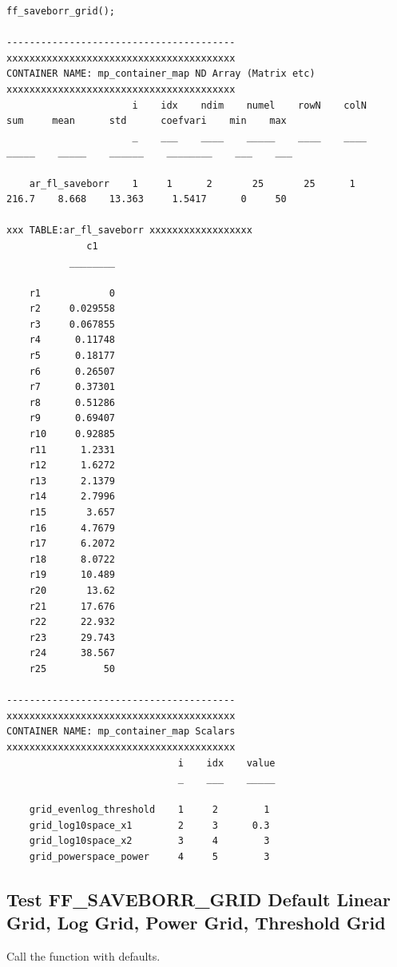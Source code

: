 \documentclass[
]{book}
\begin{document}
\begin{verbatim}
ff_saveborr_grid();

----------------------------------------
xxxxxxxxxxxxxxxxxxxxxxxxxxxxxxxxxxxxxxxx
CONTAINER NAME: mp_container_map ND Array (Matrix etc)
xxxxxxxxxxxxxxxxxxxxxxxxxxxxxxxxxxxxxxxx
                      i    idx    ndim    numel    rowN    colN     sum     mean      std      coefvari    min    max
                      _    ___    ____    _____    ____    ____    _____    _____    ______    ________    ___    ___

    ar_fl_saveborr    1     1      2       25       25      1      216.7    8.668    13.363     1.5417      0     50 

xxx TABLE:ar_fl_saveborr xxxxxxxxxxxxxxxxxx
              c1   
           ________

    r1            0
    r2     0.029558
    r3     0.067855
    r4      0.11748
    r5      0.18177
    r6      0.26507
    r7      0.37301
    r8      0.51286
    r9      0.69407
    r10     0.92885
    r11      1.2331
    r12      1.6272
    r13      2.1379
    r14      2.7996
    r15       3.657
    r16      4.7679
    r17      6.2072
    r18      8.0722
    r19      10.489
    r20       13.62
    r21      17.676
    r22      22.932
    r23      29.743
    r24      38.567
    r25          50

----------------------------------------
xxxxxxxxxxxxxxxxxxxxxxxxxxxxxxxxxxxxxxxx
CONTAINER NAME: mp_container_map Scalars
xxxxxxxxxxxxxxxxxxxxxxxxxxxxxxxxxxxxxxxx
                              i    idx    value
                              _    ___    _____

    grid_evenlog_threshold    1     2        1 
    grid_log10space_x1        2     3      0.3 
    grid_log10space_x2        3     4        3 
    grid_powerspace_power     4     5        3 
\end{verbatim}

\hypertarget{test-ff_saveborr_grid-default-linear-grid-log-grid-power-grid-threshold-grid}{%
\subsection{Test FF\_SAVEBORR\_GRID Default Linear Grid, Log Grid, Power Grid, Threshold Grid}\label{test-ff_saveborr_grid-default-linear-grid-log-grid-power-grid-threshold-grid}}

Call the function with defaults.
\end{document}
